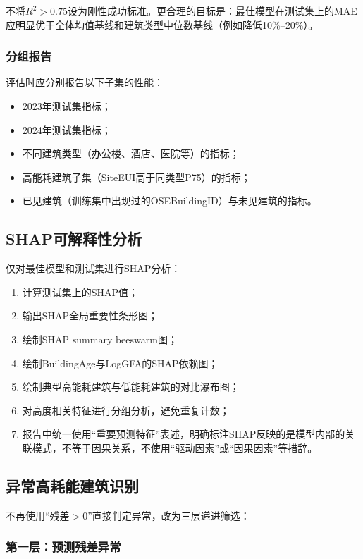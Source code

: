 不将$R^2>0.75$设为刚性成功标准。更合理的目标是：最佳模型在测试集上的MAE应明显优于全体均值基线和建筑类型中位数基线（例如降低10\%--20\%）。

\subsubsection{分组报告}

评估时应分别报告以下子集的性能：
\begin{itemize}
    \item 2023年测试集指标；
    \item 2024年测试集指标；
    \item 不同建筑类型（办公楼、酒店、医院等）的指标；
    \item 高能耗建筑子集（SiteEUI高于同类型P75）的指标；
    \item 已见建筑（训练集中出现过的OSEBuildingID）与未见建筑的指标。
\end{itemize}

\subsection{SHAP可解释性分析}

仅对最佳模型和测试集进行SHAP分析：
\begin{enumerate}
    \item 计算测试集上的SHAP值；
    \item 输出SHAP全局重要性条形图；
    \item 绘制SHAP summary beeswarm图；
    \item 绘制BuildingAge与LogGFA的SHAP依赖图；
    \item 绘制典型高能耗建筑与低能耗建筑的对比瀑布图；
    \item 对高度相关特征进行分组分析，避免重复计数；
    \item 报告中统一使用``重要预测特征''表述，明确标注SHAP反映的是模型内部的关联模式，不等于因果关系，不使用``驱动因素''或``因果因素''等措辞。
\end{enumerate}

\subsection{异常高耗能建筑识别}

不再使用``残差$>0$''直接判定异常，改为三层递进筛选：

\subsubsection{第一层：预测残差异常}

